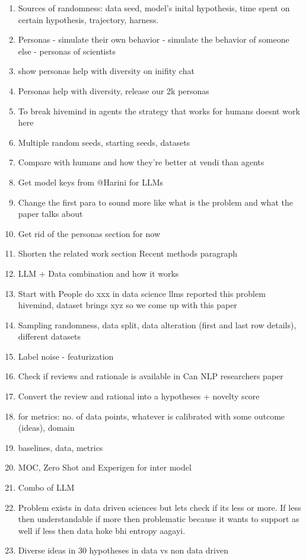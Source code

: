 \begin{enumerate}
\item Sources of randomness: data seed, model's inital hypothesis, time spent on certain hypothesis, trajectory, harness.
\item Personas
- simulate their own behavior
- simulate the behavior of someone else
- personas of scientists
\item show personas help with diversity on inifity chat
\item Personas help with diversity, release our 2k personas
\item To break hivemind in agents the strategy that works for humans doesnt work here
\item Multiple random seeds, starting seeds, datasets
\item Compare with humans and how they're better at vendi than agents
\item Get model keys from @Harini for LLMs
\item Change the first para to sound more like what is the problem and what the paper talks about
\item Get rid of the personas section for now
\item Shorten the related work section Recent methods paragraph
\item LLM + Data combination and how it works
\item Start with People do xxx in data science llms reported this problem hivemind, dataset brings xyz so we come up with this paper
\item Sampling randomness, data split, data alteration (first and last row details), different datasets
\item Label noise - featurization
\item Check if reviews and rationale is available in Can NLP researchers paper
\item Convert the review and rational into a hypotheses + novelty score
\item for metrics: no. of data points, whatever is calibrated with some outcome (ideas), domain
\item baselines, data, metrics
\item MOC, Zero Shot and Experigen for inter model
\item Combo of LLM
\item Problem exists in data driven sciences but lets check if its less or more. If less then understandable if more then problematic because it wants to support as well if less then data hoke bhi entropy aagayi.
\item Diverse ideas in 30 hypotheses in data vs non data driven

\end{enumerate}
